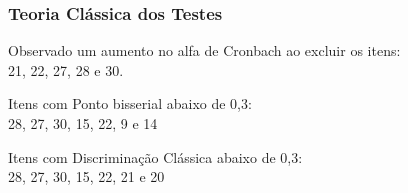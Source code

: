\documentclass{beamer}
\begin{document}
	
	
	\begin{frame}
		
		\frametitle{Teoria Clássica dos Testes}
		
			
			Observado um aumento no alfa de Cronbach ao excluir os itens:\\
			21, 22, 27, 28 e 30.
			
			Itens com Ponto bisserial abaixo de 0,3:\\
			28, 27, 30, 15, 22, 9 e 14
			
			Itens com Discriminação Clássica abaixo de 0,3:\\
			28, 27, 30, 15, 22, 21 e 20


		
	\end{frame}
	
\end{document}
